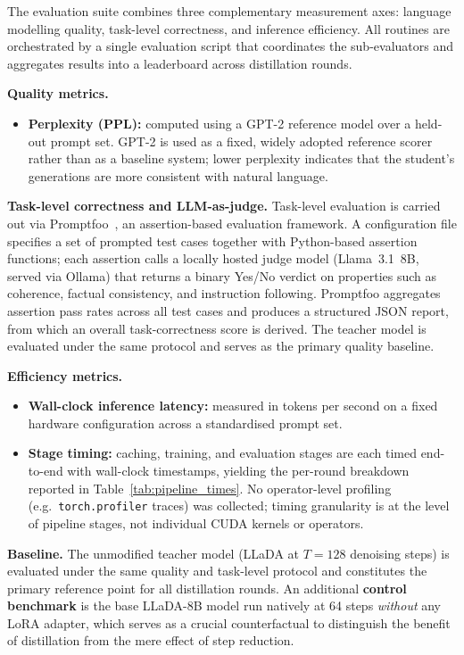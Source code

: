 \documentclass[11pt, a4paper]{article}
\begin{document}
The evaluation suite combines three complementary measurement axes: language
modelling quality, task-level correctness, and inference efficiency. All routines
are orchestrated by a single evaluation script that coordinates the sub-evaluators
and aggregates results into a leaderboard across distillation rounds.

\noindent\textbf{Quality metrics.}
\begin{itemize}
    \item \textbf{Perplexity (PPL):} computed using a GPT-2 reference model over
    a held-out prompt set. GPT-2 is used as a fixed, widely adopted reference
    scorer rather than as a baseline system; lower perplexity indicates that the
    student's generations are more consistent with natural language.
\end{itemize}

\noindent\textbf{Task-level correctness and LLM-as-judge.}
Task-level evaluation is carried out via Promptfoo~\cite{promptfoo2024}, an assertion-based evaluation
framework. A configuration file specifies a set of prompted test cases together
with Python-based assertion functions; each assertion calls a locally hosted judge
model (Llama~3.1~8B, served via Ollama) that returns a binary Yes/No verdict on
properties such as coherence, factual consistency, and instruction following.
Promptfoo aggregates assertion pass rates across all test cases and produces a
structured JSON report, from which an overall task-correctness score is derived.
The teacher model is evaluated under the same protocol and serves as the primary
quality baseline.

\noindent\textbf{Efficiency metrics.}
\begin{itemize}
    \item \textbf{Wall-clock inference latency:} measured in tokens per second on
    a fixed hardware configuration across a standardised prompt set.
    \item \textbf{Stage timing:} caching, training, and evaluation stages are each
    timed end-to-end with wall-clock timestamps, yielding the per-round breakdown
    reported in Table~\ref{tab:pipeline_times}. No operator-level profiling
    (e.g.\ \texttt{torch.profiler} traces) was collected; timing granularity is at
    the level of pipeline stages, not individual CUDA kernels or operators.
\end{itemize}

\noindent\textbf{Baseline.}
The unmodified teacher model (LLaDA at $T=128$ denoising steps) is evaluated
under the same quality and task-level protocol and constitutes the primary
reference point for all distillation rounds. An additional \textbf{control benchmark}
is the base LLaDA-8B model run natively at 64 steps \emph{without} any LoRA adapter,
which serves as a crucial counterfactual to distinguish the benefit of distillation
from the mere effect of step reduction.
\end{document}
